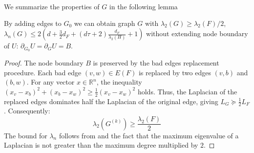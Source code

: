 \documentclass[a4paper,USenglish,cleveref, autoref, thm-restate]{lipics-v2021}
\begin{document}
We summarize the properties of $G$ in the following lemma
\begin{lemma}\label{lem:patch}
  By adding edges to $G_0$ we can obtain graph $G$ with $\lambda_2(G) \geq \lambda_2(F)/2$, $\lambda_n(G) \leq 2(d + \frac{3}{2} d_F + (d\tau+ 2)\frac{d_F}{\lambda_2(H)} + 1)$ without extending node boundary of $U$: $\partial_{G_0} U = \partial_{G} U = B$.
\end{lemma}
\begin{proof}
    The node boundary $B$ is preserved by the bad edges replacement procedure.
    Each bad edge $(v,w) \in E(F)$ is replaced by two edges $(v,b)$ and $(b,w)$. For any vector $x \in \mathbb{R}^n$, the inequality $(x_v - x_b)^2 + (x_b - x_w)^2 \geq \frac{1}{2}(x_v - x_w)^2$ holds. Thus, the Laplacian of the replaced edges dominates half the Laplacian of the original edge, giving $L_{G} \succeq \frac{1}{2} L_F$. Consequently:
\begin{equation}
    \lambda_2(G^{(k)}) \geq \frac{\lambda_2(F)}{2}
\end{equation}
    The bound for $\lambda_n$ follows from  and the fact that the maximum eigenvalue of a Laplacian is not greater than the maximum degree multiplied by $2$.
\end{proof}
\end{document}
